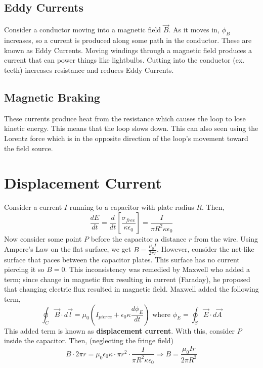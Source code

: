 \documentclass{article}
\begin{document}
\subsection{Eddy Currents}
Consider a conductor moving into a magnetic field $\vec{B}$. As it moves in, $\phi_{B}$ increases, so a current is produced
along some path in the conductor. These are known as Eddy Currents. Moving windings through a magnetic field produces a current that can power things like lightbulbs.
Cutting into the conductor (ex. teeth) increases resistance and reduces Eddy Currents.

\subsection{Magnetic Braking}
These currents produce heat from the resistance which causes the loop to lose kinetic energy. This means that the loop slows down.
This can also seen using the Lorentz force which is in the opposite direction of the loop's movement toward the field source.

\section{Displacement Current}
Consider a current $I$ running to a capacitor with plate radius $R$. Then,
$$\frac{dE}{dt}=\frac{d}{dt}\left[\frac{\sigma_{free}}{\kappa\epsilon_0}\right]
=\frac{I}{\pi R^{2}\kappa \epsilon_0}$$
Now consider some point $P$ before the capacitor a distance $r$ from the wire. 
Using Ampere's Law on the flat surface, we get $B=\frac{\mu_{0}I}{2\pi r}$.
However, consider the net-like surface that paces between the capacitor plates. This surface
has no current piercing it so $B=0$. This inconsistency was remedied by Maxwell who added a 
term; since change in magnetic flux resulting in current (Faraday), he proposed that changing
electric flux resulted in magnetic field. Maxwell added the following term,
$$\oint_{C}\vec{B}\cdot d\vec{l}=\mu_{0}\left(I_{pierce}+\epsilon_{0}\kappa \frac{d\phi_{E}}{dt}\right)
\text{ where }
\phi_{E}=\oint_{S}\vec{E}\cdot d\vec{A}$$
This added term is known as \textbf{displacement current}. With this, consider $P$ inside the capacitor.
Then, (neglecting the fringe field)
$$B\cdot 2\pi r=\mu_{0}\epsilon_{0}\kappa \cdot \pi r^{2}\cdot \frac{I}{\pi R^{2}\kappa \epsilon_{0}}
\Rightarrow B=\frac{\mu_{0}Ir}{2\pi R^{2}}$$
\end{document}
